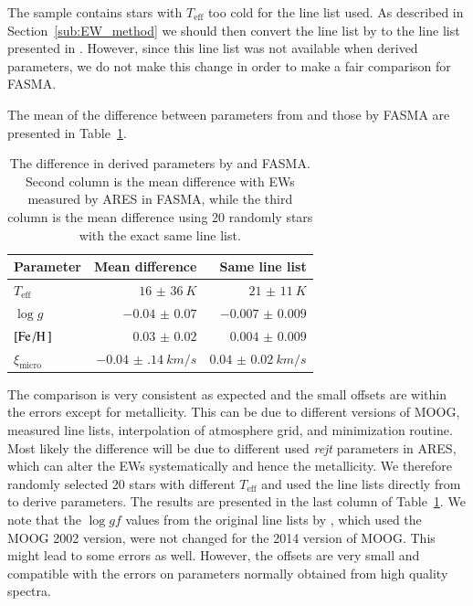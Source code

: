 \documentclass{aa}
\begin{document}
The sample contains stars with $T_\mathrm{eff}$ too cold for the line list used.
As described in Section~\ref{sub:EW_method} we should then convert the line list
by \citet{Sousa2008a} to the line list presented in \citet{Tsantaki2013}.
However, since this line list was not available when \citet{Sousa2011} derived
parameters, we do not make this change in order to make a fair comparison for
FASMA.

The mean of the difference between parameters from \citet{Sousa2011} and those
by FASMA are presented in Table~\ref{tab:FASMATest}.

\begin{table}[htb!]
    \caption{The difference in derived parameters by \citet{Sousa2011}
    and FASMA. Second column is the mean difference with EWs measured by
    ARES in FASMA, while the third column is the mean difference using
    20 randomly stars with the exact same line list.}
    \label{tab:FASMATest}
    \centering
    \begin{tabular}{lrr}
      \hline\hline
      Parameter             &  Mean difference         & Same line list        \\
      \hline
      $T_\mathrm{eff}$      &  $\SI{16(36)}{K}$        & $\SI{21(11)}{K}$      \\
      $\log g$              &  $\num{-0.04(7)}$        & $\num{-0.007(9)}$     \\
      $[\ion{Fe}/\ion{H}]$  &  $\num{0.03(2)}$         & $\num{0.004(9)}$      \\
      $\xi_\mathrm{micro}$  &  $\SI{-0.04(14)}{km/s}$  & $\SI{0.04(2)}{km/s}$  \\
      \hline
    \end{tabular}
\end{table}

The comparison is very consistent as expected and the small offsets are within
the errors except for metallicity. This can be due to different versions of
MOOG, measured line lists, interpolation of atmosphere grid, and minimization
routine. Most likely the difference will be due to different used \emph{rejt}
parameters in ARES, which can alter the EWs systematically and hence the
metallicity. We therefore randomly selected 20 stars with different
$T_\mathrm{eff}$ and used the line lists directly from \citet{Sousa2011} to
derive parameters. The results are presented in the last column of
Table~\ref{tab:FASMATest}. We note that the $\log gf$ values from the original
line lists by \citet{Sousa2011}, which used the MOOG 2002 version, were not
changed for the 2014 version of MOOG. This might lead to some errors as well.
However, the offsets are very small and compatible with the errors on parameters
normally obtained from high quality spectra.
\end{document}
